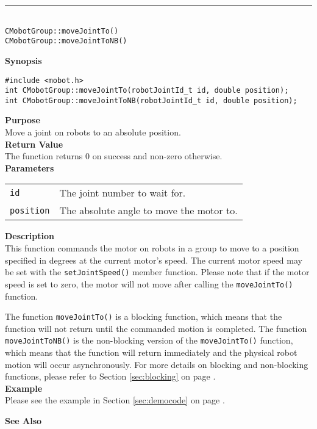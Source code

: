 \noindent
\vspace{5pt}
\rule{4.5in}{0.015in}\\
\noindent
{\LARGE \texttt{CMobotGroup::moveJointTo()}}\\
{\LARGE \texttt{CMobotGroup::moveJointToNB()}}\\
{}

\noindent
{\bf Synopsis}
\begin{verbatim}
#include <mobot.h>
int CMobotGroup::moveJointTo(robotJointId_t id, double position);
int CMobotGroup::moveJointToNB(robotJointId_t id, double position);
\end{verbatim}

\noindent
{\bf Purpose}\\
Move a joint on robots to an absolute position.\\

\noindent
{\bf Return Value}\\
The function returns 0 on success and non-zero otherwise.\\

\noindent
{\bf Parameters}\\
\vspace{-0.1in}
\begin{description}
\item               
\begin{tabular}{p{10 mm}p{145 mm}}
\texttt{id} & The joint number to wait for. \\
\texttt{position} & The absolute angle to move the motor to.  \\
\end{tabular}
\end{description}

\noindent
{\bf Description}\\
This function commands the motor on robots in a group to move to a position specified in degrees at
the current motor's speed. The current motor speed may be set with the
\texttt{setJointSpeed()} member function. Please note that if the motor speed
is set to zero, the motor will not move after calling the
\texttt{moveJointTo()} function. 

The function \texttt{moveJointTo()} is a blocking function, which means that 
the function will not return until the commanded motion is 
completed. The function \texttt{moveJointToNB()} is the non-blocking version of
the \texttt{moveJointTo()} function, which means that the function will return
immediately and the physical robot motion will occur asynchronously. For
more details on blocking and non-blocking functions, please refer to 
Section \ref{sec:blocking} on page \pageref{sec:blocking}.\\

\noindent
{\bf Example}\\
Please see the example in Section \ref{sec:democode} on page \pageref{sec:democode}.\\
\noindent

\noindent
{\bf See Also}\\

